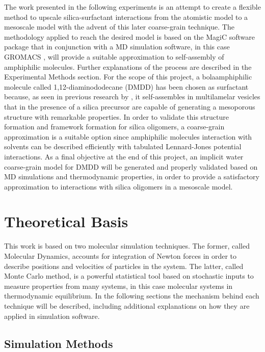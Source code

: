 \documentclass[10pt,a4paper,twoside]{article}
\begin{document}
The work presented in the following experiments is an attempt to create a flexible method to upscale silica-surfactant interactions \cite{silica1} from the atomistic model to a mesoscale model with the advent of this later coarse-grain technique. The methodology applied to reach the desired model is based on the MagiC software package \cite{magic} that in conjunction with a MD simulation software, in this case GROMACS \cite{gromacs}, will provide a suitable approximation to self-assembly of amphiphilic molecules. Further explanations of the process are described in the Experimental Methods section. For the scope of this project, a bolaamphiphilic molecule called 1,12-diaminododecane (DMDD) has been chosen as surfactant because, as seen in previous research by , it self-assembles in multilamelar vesicles that in the presence of a silica precursor are capable of generating a mesoporous structure with remarkable properties. In order to validate this structure formation and framework formation for silica oligomers, a coarse-grain approximation is a suitable option since amphiphilic molecules interaction with solvents can be described efficiently with tabulated Lennard-Jones potential interactions. As a final objective at the end of this project, an implicit water coarse-grain model for DMDD will be generated and properly validated based on MD simulations and thermodynamic properties, in order to provide a satisfactory approximation to interactions with silica oligomers in a mesoscale model. 
\section{Theoretical Basis}
This work is based on two molecular simulation techniques. The former, called Molecular Dynamics, accounts for integration of Newton forces in order to describe positions and velocities of particles in the system. The latter, called Monte Carlo method, is a powerful statistical tool based on stochastic inputs to measure properties from many systems, in this case molecular systems in thermodynamic equilibrium. In the following sections the mechanism behind each technique will be described, including additional explanations on how they are applied in simulation software.
\subsection{Simulation Methods}
\end{document}
